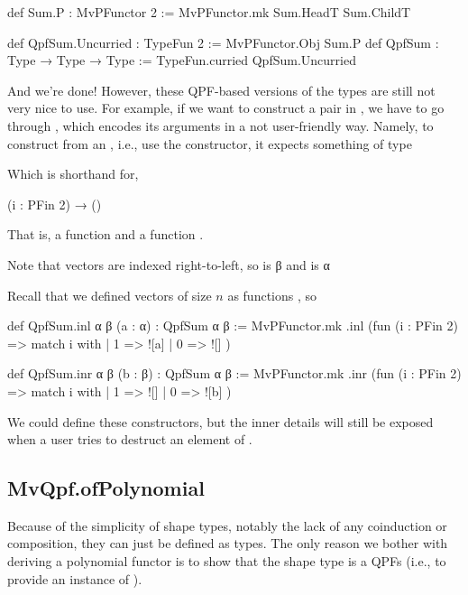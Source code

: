 \begin{leancode}
    def Sum.P  : MvPFunctor 2 := MvPFunctor.mk Sum.HeadT  Sum.ChildT
    
    def QpfSum.Uncurried : TypeFun 2   := MvPFunctor.Obj Sum.P
    def QpfSum : Type → Type → Type := TypeFun.curried QpfSum.Uncurried
\end{leancode}

And we're done! However, these QPF-based versions of the types are still not very nice to use.
For example, if we want to construct a pair in , we have to go through ,
which encodes its arguments in a not user-friendly way. 
Namely, to construct  from an , i.e., use the  constructor, 
it expects something of type
\begin{center}
\end{center}
Which is shorthand for, 
\begin{center}
    (i : PFin 2) → ()
\end{center}
That is, a function  and a function .
\begin{remark}
    Note that vectors are indexed right-to-left, so  is β
    and  is α
\end{remark}

Recall that we defined vectors of size $n$ as functions , so 


\begin{leancode}
    def QpfSum.inl {α β} (a : α) : QpfSum α β :=
      MvPFunctor.mk .inl (fun (i : PFin 2) => match i with
        | 1 => ![a]
        | 0 => ![]
      )
    
    def QpfSum.inr {α β} (b : β) : QpfSum α β :=
      MvPFunctor.mk .inr (fun (i : PFin 2) => match i with
        | 1 => ![]
        | 0 => ![b]
      )
\end{leancode}


We could define these constructors, but the inner details will still be exposed
when a user tries to destruct an element of .

\subsection{MvQpf.ofPolynomial}
Because of the simplicity of shape types, notably the lack of any coinduction or composition, they can just be defined as 
\inductive{} types. The only reason we bother with deriving a polynomial functor is to show that
the shape type is a QPFs (i.e., to provide an instance of ).

